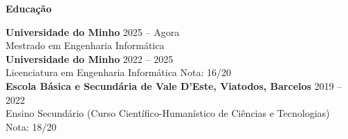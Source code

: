 \noindent\textbf{Educação}
\noindent\hrulefill
\vspace{0.25em}
\begin{adjustwidth}{1.5em}{0em}
\textbf{Universidade do Minho} \hfill 2025 -- Agora \\
Mestrado em Engenharia Informática\vspace{0.5em}
\\
\textbf{Universidade do Minho} \hfill 2022 -- 2025 \\
Licenciatura em Engenharia Informática \hfill Nota: 16/20\vspace{0.5em}
\\
\textbf{Escola Básica e Secundária de Vale D’Este, Viatodos, Barcelos} \hfill 2019 -- 2022 \\
Ensino Secundário (Curso Científico-Humanístico de Ciências e Tecnologias) \hfill Nota: 18/20
\end{adjustwidth}
\vspace{0.25em}